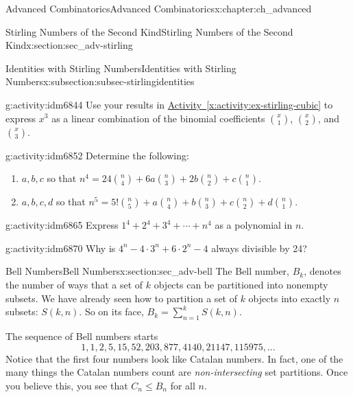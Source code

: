 \documentclass[oneside,10pt,]{book}
\numberwithin{equation}{chapter}
\begin{document}
\begin{chapterptx}{Advanced Combinatorics}{}{Advanced Combinatorics}{}{}{x:chapter:ch_advanced}
\begin{sectionptx}{Stirling Numbers of the Second Kind}{}{Stirling Numbers of the Second Kind}{}{}{x:section:sec_adv-stirling}
\begin{subsectionptx}{Identities with Stirling Numbers}{}{Identities with Stirling Numbers}{}{}{x:subsection:subsec-stirlingidentities}
\begin{activity}{}{g:activity:idm6844}
Use your results in \hyperref[x:activity:ex-stirling-cubic]{Activity~\ref{x:activity:ex-stirling-cubic}} to express \(x^3\) as a linear combination of the binomial coefficients \(\binom{x}{1}\), \(\binom{x}{2}\), and \(\binom{x}{3}\).%
\end{activity}
\begin{activity}{}{g:activity:idm6852}%
Determine the following:%
\begin{enumerate}[font=\bfseries,label=(\alph*),ref=\alph*]
\item{}\(a, b, c\) so that \(n^4 = 24\binom{n}{4} + 6a\binom{n}{3}+2b\binom{n}{2} + c \binom{n}{1}\).%
\item{}\(a, b, c, d\) so that \(n^5 = 5!\binom{n}{5} + a\binom{n}{4} + b\binom{n}{3} + c \binom{n}{2} + d \binom{n}{1}\).%
\end{enumerate}
\end{activity}
\begin{activity}{}{g:activity:idm6865}%
Express \(1^4 + 2^4 + 3^4 + \cdots + n^4\) as a polynomial in \(n\).%
\end{activity}
\begin{activity}{}{g:activity:idm6870}%
Why is \(4^n - 4\cdot 3^n + 6\cdot 2^n - 4\) always divisible by 24?%
\end{activity}
\end{subsectionptx}
\end{sectionptx}
%
%
\typeout{************************************************}
\typeout{************************************************}
%
\begin{sectionptx}{Bell Numbers}{}{Bell Numbers}{}{}{x:section:sec_adv-bell}
The Bell number, \(B_{k}\), denotes the number of ways that a set of \(k\) objects can be partitioned into nonempty subsets. We have already seen how to partition a set of \(k\) objects into exactly \(n\) subsets: \(S(k,n)\).  So on its face, \(B_k = \sum_{n=1}^kS(k,n)\).%
\par
The sequence of Bell numbers starts%
\begin{equation*}
1, 1, 2, 5, 15, 52, 203, 877, 4140, 21147, 115975, \ldots
\end{equation*}
Notice that the first four numbers look like Catalan numbers.  In fact, one of the many things the Catalan numbers count are \emph{non-intersecting} set partitions.  Once you believe this, you see that \(C_n \le B_n\) for all \(n\).%
\par

\end{sectionptx}
\end{chapterptx}
\end{document}
